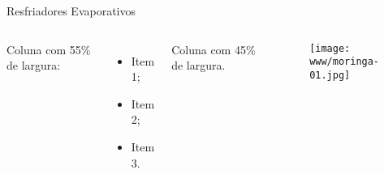    \begin{frame}\vspace*{-0em}
    \end{frame}
    \begin{frame}\vspace*{-0em}
    \end{frame}
    \begin{frame}\vspace*{-0em}
        \begin{columns}
        \end{columns}
    \end{frame}
    \begin{frame}\vspace*{-0em}
        \begin{columns}
        \end{columns}
    \end{frame}

    \begin{frame}{Resfriadores Evaporativos}\vspace*{-0em}
        \begin{columns}
            Coluna com 55\% de largura:\\[\smallskipamount]
            \begin{itemize}
                \item<1-> Item 1;
                \item<2-> Item 2;
                \item<3-> Item 3.
            \end{itemize}
            Coluna com 45\% de largura.
            \begin{center}
                \begin{figure}
                    \texttt{[image: www/moringa-01.jpg]}
                \end{figure}
            \end{center}
        \end{columns}
    \end{frame}

